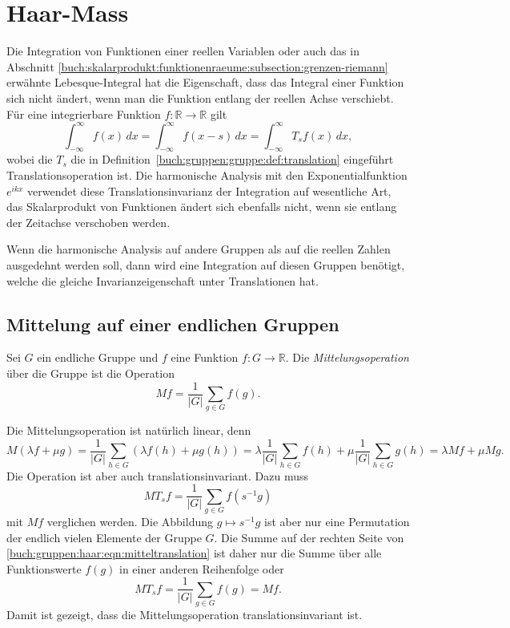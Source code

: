 %
%
%
\section{Haar-Mass
\label{buch:gruppen:section:haar}}
Die Integration von Funktionen einer reellen Variablen oder auch
das in Abschnitt
\ref{buch:skalarprodukt:funktionenraeume:subsection:grenzen-riemann}
erwähnte Lebesque-Integral hat die Eigenschaft, dass das
Integral einer Funktion sich nicht ändert, wenn man die Funktion
entlang der reellen Achse verschiebt.
Für eine integrierbare Funktion $f\colon\mathbb{R}\to\mathbb{R}$
gilt
\[
\int_{-\infty}^\infty f(x)\,dx
=
\int_{-\infty}^\infty f(x-s)\,dx
=
\int_{-\infty}^\infty T_sf(x)\,dx,
\]
wobei die $T_s$ die in Definition~\ref{buch:gruppen:gruppe:def:translation}
eingeführt Translationsoperation ist.
Die harmonische Analysis mit den Exponentialfunktion $e^{ikx}$ 
verwendet diese Translationsinvarianz der Integration auf wesentliche Art,
das Skalarprodukt von Funktionen ändert sich ebenfalls nicht, wenn sie
entlang der Zeitachse verschoben werden.

Wenn die harmonische Analysis auf andere Gruppen als auf die reellen
Zahlen ausgedehnt werden soll, dann wird eine Integration auf diesen
Gruppen benötigt, welche die gleiche Invarianzeigenschaft unter
Translationen hat.

%
%
\subsection{Mittelung auf einer endlichen Gruppen
\label{buch:haar:subsection:endlich}}

\begin{definition}
\label{buch:gruppen:haar:def:mittelung}
Sei $G$ ein endliche Gruppe und $f$ eine Funktion $f\colon G\to \mathbb{R}$.
Die {\em Mittelungsoperation} über die Gruppe ist die Operation
\[
Mf = \frac{1}{|G|}\sum_{g\in G} f(g).
\]
\end{definition}

Die Mittelungsoperation ist natürlich linear, denn
\[
M(\lambda f + \mu g)
=
\frac{1}{|G|}
\sum_{h\in G}
(\lambda f(h)+\mu g(h))
=
\lambda \frac{1}{|G|}\sum_{h\in G}f(h)
+
\mu \frac{1}{|G|}\sum_{h\in G}g(h)
=
\lambda Mf + \mu Mg.
\]
Die Operation ist aber auch translationsinvariant.
Dazu muss
\begin{equation}
MT_sf
=
\frac{1}{|G|}
\sum_{g\in G} f(s^{-1}g)
\label{buch:gruppen:haar:eqn:mitteltranslation}
\end{equation}
mit $Mf$ verglichen werden.
Die Abbildung $g\mapsto s^{-1}g$ ist aber nur eine Permutation der endlich
vielen Elemente der Gruppe $G$.
Die Summe auf der rechten Seite von
\eqref{buch:gruppen:haar:eqn:mitteltranslation}
ist daher nur die Summe über alle Funktionswerte $f(g)$ in einer anderen
Reihenfolge oder
\[
MT_sf
=
\frac{1}{|G|} \sum_{g\in G}f(g)
=Mf.
\]
Damit ist gezeigt, dass die Mittelungsoperation translationsinvariant
ist.

